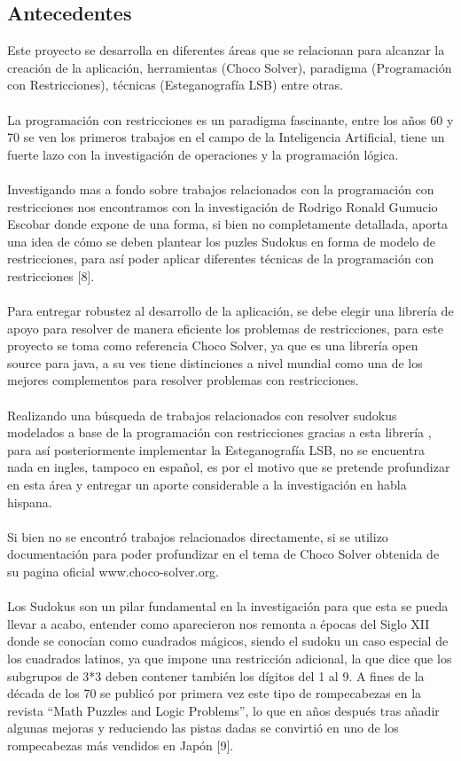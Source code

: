 \documentclass[14pt]{article}
\begin{document}
	\subsection{Antecedentes}
Este proyecto se desarrolla en diferentes áreas que se relacionan para alcanzar la creación de la aplicación, herramientas (Choco Solver), paradigma (Programación con Restricciones), técnicas (Esteganografía LSB) entre otras.
		\\~\\
La programación con restricciones es un paradigma fascinante, entre los años 60 y 70 se ven los primeros trabajos en el campo de la Inteligencia Artificial, tiene un fuerte lazo con la investigación de operaciones y la programación lógica.
		\\~\\
Investigando mas a fondo sobre trabajos relacionados con la programación con restricciones nos encontramos con la investigación de Rodrigo Ronald Gumucio Escobar  donde expone de una forma, si bien no completamente detallada, aporta una idea de cómo se deben plantear los puzles Sudokus en forma de modelo de restricciones, para así poder aplicar diferentes técnicas de la programación con restricciones [8].
		\\~\\
Para entregar robustez al desarrollo de la aplicación, se debe elegir una librería de apoyo para resolver de manera eficiente los problemas de restricciones, para este proyecto se toma como referencia Choco Solver, ya que es una librería open source para java, a su ves tiene distinciones a nivel mundial como una de los mejores complementos para resolver problemas con restricciones. 
		\\~\\
Realizando una búsqueda de trabajos relacionados con resolver sudokus modelados a base de la programación con restricciones gracias a esta librería , para así posteriormente implementar la Esteganografía LSB, no se encuentra nada en ingles, tampoco en español, es por el motivo que se pretende profundizar en esta área y entregar un aporte considerable a la investigación en habla hispana.
		\\~\\
Si bien no se encontró trabajos relacionados directamente, si se utilizo documentación  para poder profundizar en el tema de Choco Solver obtenida de su pagina oficial www.choco-solver.org.
		\\~\\	
Los Sudokus son un pilar fundamental en la investigación para que esta se pueda llevar a acabo, entender como aparecieron nos remonta a épocas del Siglo XII donde se conocían como cuadrados mágicos, siendo el sudoku un caso especial de los cuadrados latinos, ya que impone una restricción adicional, la que dice que los subgrupos de 3*3 deben contener también los dígitos del 1 al 9. A fines de la década de los 70 se publicó por primera vez este tipo de rompecabezas en la revista “Math Puzzles and Logic Problems”, lo que en años después tras añadir algunas mejoras y reduciendo las pistas dadas se convirtió en uno de los rompecabezas más vendidos en Japón [9].
\end{document}
